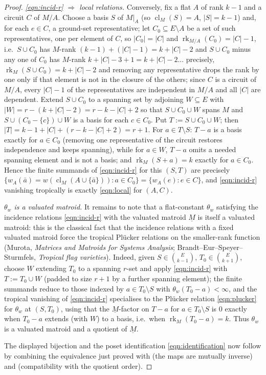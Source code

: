 \documentclass{article}
\theoremstyle{definition}
\newcommand{\rk}{\operatorname{rk}}
\newcommand{\cl}{\operatorname{cl}}
\begin{document}
\begin{proof}
\smallskip
\noindent\emph{\eqref{eqn:incid-r} $\Rightarrow$ local relations.} Conversely, fix a flat $A$ of rank
$k-1$ and a circuit $C$ of $M/A$. Choose a basis $S$ of $M|_A$ (so $\cl_M(S)=A$, $|S|=k-1$) and, for
each $e\in C$, a ground-set representative; let $C_0\subseteq E\setminus A$ be a set of such
representatives, one per element of $C$, so $|C_0|=|C|$ and $\rk_{M/A}(C_0)=|C|-1$, i.e.\ $S\cup C_0$
has $M$-rank $(k-1)+(|C|-1)=k+|C|-2$ and $S\cup C_0$ minus any one of $C_0$ has $M$-rank $k+|C|-3+1=
k+|C|-2$... precisely, $\rk_M(S\cup C_0)=k+|C|-2$ and removing any representative drops the rank by
one only if that element is not in the closure of the others; since $C$ is a circuit of $M/A$, every
$|C|-1$ of the representatives are independent in $M/A$ and all $|C|$ are dependent. Extend $S\cup C_0$
to a spanning set by adjoining $W\subseteq E$ with $|W|=r-(k+|C|-2)=r-k-|C|+2$ so that $S\cup C_0\cup
W$ spans $M$ and $S\cup(C_0-\{c\})\cup W$ is a basis for each $c\in C_0$. Put $T:=S\cup C_0\cup W$;
then $|T|=k-1+|C|+(r-k-|C|+2)=r+1$. For $a\in T\setminus S$: $T-a$ is a basis exactly for $a\in C_0$
(removing one representative of the circuit restores independence and keeps spanning), while for
$a\in W$, $T-a$ omits a needed spanning element and is not a basis; and $\rk_M(S+a)=k$ exactly for
$a\in C_0$. Hence the finite summands of \eqref{eqn:incid-r} for this $(S,T)$ are precisely
$\{w_A(\bar a)=w(\cl_M(A\cup\{\bar a\})):a\in C_0\}=\{w_A(e):e\in C\}$, and \eqref{eqn:incid-r}
vanishing tropically is exactly \eqref{eqn:local} for $(A,C)$.

\smallskip
\noindent\emph{$\theta_w$ is a valuated matroid.} It remains to note that a flat-constant $\theta_w$
satisfying the incidence relations \eqref{eqn:incid-r} with the valuated matroid $\underline M$ is
itself a valuated matroid: this is the classical fact that the incidence relations with a fixed
valuated matroid force the tropical Pl\"ucker relations on the smaller-rank function (Murota,
\emph{Matrices and Matroids for Systems Analysis}; Brandt--Eur--Speyer--Sturmfels,
\emph{Tropical flag varieties}). Indeed, given $S\in\binom{E}{k-1}$, $T_0\in\binom{E}{k+1}$, choose
$W$ extending $T_0$ to a spanning $r$-set and apply \eqref{eqn:incid-r} with $T:=T_0\cup W$ (padded to
size $r+1$ by a further spanning element); the finite summands reduce to those indexed by
$a\in T_0\setminus S$ with $\theta_w(T_0-a)<\infty$, and the tropical vanishing of \eqref{eqn:incid-r}
specialises to the Pl\"ucker relation \eqref{eqn:plucker} for $\theta_w$ at $(S,T_0)$, using that the
$\underline M$-factor on $T-a$ for $a\in T_0\setminus S$ is $0$ exactly when $T_0-a$ extends (with
$W$) to a basis, i.e.\ when $\rk_M(T_0-a)=k$. Thus $\theta_w$ is a valuated matroid and a quotient of
$\underline M$.

The displayed bijection and the poset identification \eqref{eqn:identification} now follow by
combining the equivalence just proved with  (the maps are mutually inverse) and
 (compatibility with the quotient order).
\end{proof}
\end{document}
